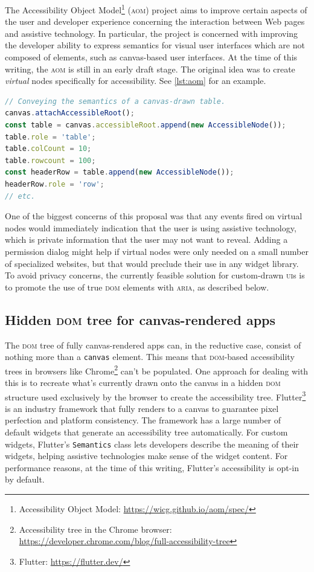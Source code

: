 \documentclass[sigconf]{acmart}
\begin{document}
The Accessibility Object Model\footnote{Accessibility Object Model: \url{https://wicg.github.io/aom/spec/}} (\textsc{aom}) project aims to improve certain aspects of the user and developer experience concerning the interaction between Web pages and assistive technology. In particular, the project is concerned with improving the developer ability to express semantics for visual user interfaces which are not composed of elements, such as canvas-based user interfaces. At the time of this writing, the \textsc{aom} is still in an early draft stage. The original idea was to create \textit{virtual} nodes specifically for accessibility. See \autoref{lst:aom} for an example.

\begin{lstlisting}[language=JavaScript, style=ES6, label={lst:aom}, caption={The now retracted \texttt{AccessibleNode} \textsc{api} of the Accessibility Object Model.}]
// Conveying the semantics of a canvas-drawn table.
canvas.attachAccessibleRoot();
const table = canvas.accessibleRoot.append(new AccessibleNode());
table.role = 'table';
table.colCount = 10;
table.rowcount = 100;
const headerRow = table.append(new AccessibleNode());
headerRow.role = 'row';
// etc.
\end{lstlisting}

One of the biggest concerns of this proposal was that any events fired on virtual nodes would immediately indication that the user is using assistive technology, which is private information that the user may not want to reveal. Adding a permission dialog might help if virtual nodes were only needed on a small number of specialized websites, but that would preclude their use in any widget library. To avoid privacy concerns, the currently feasible solution for custom-drawn \textsc{ui}s is to promote the use of true \textsc{dom} elements with \textsc{aria}, as described below.

\subsection{Hidden \textsc{dom} tree for canvas-rendered apps}

 The \textsc{dom} tree of fully canvas-rendered apps can, in the reductive case, consist of nothing more than a \texttt{canvas} element. This means that \textsc{dom}-based accessibility trees in browsers like Chrome\footnote{Accessibility tree in the Chrome browser: \url{https://developer.chrome.com/blog/full-accessibility-tree}} can't be populated. One approach for dealing with this is to recreate what's currently drawn onto the canvas in a hidden \textsc{dom} structure used exclusively by the browser to create the accessibility tree. Flutter\footnote{Flutter: \url{https://flutter.dev/}} is an industry framework that fully renders to a canvas to guarantee pixel perfection and platform consistency. The framework has a large number of default widgets that generate an accessibility tree automatically. For custom widgets, Flutter's \texttt{Semantics} class lets developers describe the meaning of their widgets, helping assistive technologies make sense of the widget content. For performance reasons, at the time of this writing, Flutter's accessibility is opt-in by default.
\end{document}

